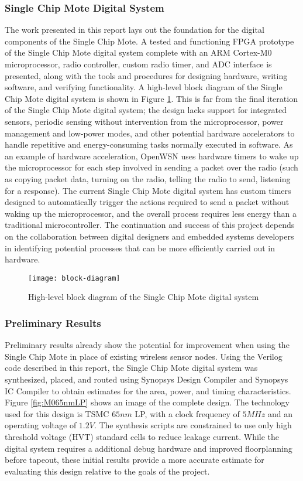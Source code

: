 \subsubsection{Single Chip Mote Digital System}
The work presented in this report lays out the foundation for the digital components of the Single Chip Mote. A tested and functioning FPGA prototype of the Single Chip Mote digital system complete with an ARM Cortex-M0 microprocessor, radio controller, custom radio timer, and ADC interface is presented, along with the tools and procedures for designing hardware, writing software, and verifying functionality. A high-level block diagram of the Single Chip Mote digital system is shown in Figure \ref{fig:block-diagram}. This is far from the final iteration of the Single Chip Mote digital system; the design lacks support for integrated sensors, periodic sensing without intervention from the microprocessor, power management and low-power modes, and other potential hardware accelerators to handle repetitive and energy-consuming tasks normally executed in software.  As an example of hardware acceleration, OpenWSN uses hardware timers to wake up the microprocessor for each step involved in sending a packet over the radio (such as copying packet data, turning on the radio, telling the radio to send, listening for a response). The current Single Chip Mote digital system has custom timers designed to automatically trigger the actions required to send a packet without waking up the microprocessor, and the overall process requires less energy than a traditional microcontroller. The continuation and success of this project depends on the collaboration between digital designers and embedded systems developers in identifying potential processes that can be more efficiently carried out in hardware.

\begin{figure}
\centering
\texttt{[image: block-diagram]}
\caption{High-level block diagram of the Single Chip Mote digital system}
\label{fig:block-diagram}
\end{figure}

\subsubsection{Preliminary Results}
Preliminary results already show the potential for improvement when using the Single Chip Mote in place of existing wireless sensor nodes. Using the Verilog code described in this report, the Single Chip Mote digital system was synthesized, placed, and routed using Synopsys Design Compiler and Synopsys IC Compiler to obtain estimates for the area, power, and timing characteristics. Figure \ref{fig:M065nmLP} shows an image of the complete design. The technology used for this design is TSMC $65nm$ LP, with a clock frequency of $5MHz$ and an operating voltage of $1.2V$. The synthesis scripts are constrained to use only high threshold voltage (HVT) standard cells to reduce leakage current. While the digital system requires a additional debug hardware and improved floorplanning before tapeout, these initial results provide a more accurate estimate for evaluating this design relative to the goals of the project.

